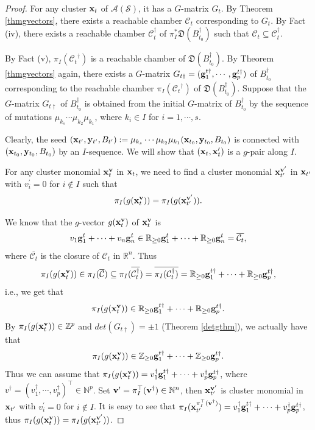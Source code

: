\documentclass[14pt]{amsart}
\begin{document}
\begin{proof}
For any cluster ${\bf x}_t$ of  $\mathcal A(\mathcal S)$, it has a $G$-matrix $G_t$. By Theorem \ref{thmgvectors}, there exists a reachable chamber $\mathcal C_t$ corresponding to $G_t$.
By Fact (iv), there exists a reachable chamber $\mathcal C_t^{\dag}$  of $\pi_I^{\ast}\mathfrak D(B_{t_0}^\dag)$
such that  $\mathcal C_t\subseteq \mathcal C_t^{\dag}$.

By Fact (v), $\pi_I({\mathcal C_t}^\dag)$ is a reachable chamber of $\mathfrak D(B_{t_0}^\dag)$. By Theorem \ref{thmgvectors} again, there exists a $G$-matrix $G_{t\dag}=({\bf g}_1^{t\dag},\cdots,{\bf g}_p^{t\dag})$ of $B_{t_0}^\dag$ corresponding to the reachable chamber $\pi_I({\mathcal C_t}^\dag)$ of  $\mathfrak D(B_{t_0}^\dag)$.
Suppose that the $G$-matrix $G_{t\dag}$ of $B_{t_0}^\dag$ is obtained from the initial $G$-matrix of  $B_{t_0}^\dag$
by the sequence of mutations $\mu_{k_s}\cdots\mu_{k_2}\mu_{k_1}$, where $k_i\in I$ for $i=1,\cdots,s$.


Clearly, the seed $({\bf x}_{t^{\prime}},{\bf y}_{t^{\prime}},B_{t^{\prime}}):=\mu_{k_s}\cdots\mu_{k_2}\mu_{k_1}({\bf x}_{t_0},{\bf y}_{t_0},B_{t_0})$ is connected with $({\bf x}_{t_0},{\bf y}_{t_0},B_{t_0})$ by an $I$-sequence. We will show that $({\bf x}_t,{\bf x}_t^\prime)$ is a $g$-pair along $I$.

For any cluster monomial ${\bf x}_t^{\bf v}$ in ${\bf x}_t$, we need to find a cluster monomial ${\bf x}_{t^{\prime}}^{{\bf v}^{\prime}}$ in ${\bf x}_{t^{\prime}}$ with $v_i^{\prime}=0$ for $i\notin I$
  such that
$$\pi_I(g({\bf x}_t^{\bf v}))=\pi_I(g({\bf x}_{t^{\prime}}^{{\bf v}^{\prime}})).$$


 We know that the $g$-vector $g({\bf x}_t^{\bf v})$ of ${\bf x}_t^{\bf v}$ is $$v_1{\bf g}_1^t+\cdots +v_n{\bf g}_n^t\in\mathbb R_{\geq0}{\bf g}_1^t+\cdots+\mathbb R_{\geq0}{\bf g}_n^t=\overline {\mathcal C_t},$$
where $\overline{\mathcal C_t}$ is the closure of $\mathcal C_t$ in $\mathbb R^n$.
Thus $$\pi_I(g({\bf x}_t^{\bf v}))\in\pi_I(\overline{\mathcal C})\subseteq\pi_I(\overline{\mathcal C_t^{\dag}})=\overline{\pi_I(\mathcal C_t^{\dag})}=\mathbb R_{\geq 0}{\bf g}_1^{t\dag}+\cdots+\mathbb R_{\geq 0}{\bf g}_p^{t\dag},$$
i.e., we get that
$$\pi_I(g({\bf x}_t^{\bf v}))\in\mathbb R_{\geq 0}{\bf g}_1^{t\dag}+\cdots+\mathbb R_{\geq 0}{\bf g}_p^{t\dag}.$$
By $\pi_I(g({\bf x}_t^{\bf v}))\in \mathbb Z^p$ and $det (G_{t\dag})=\pm 1$ (Theorem \ref{detgthm}), we actually have that
$$\pi_I(g({\bf x}_t^{\bf v}))\in \mathbb Z_{\geq 0}{\bf g}_1^{t\dag}+\cdots+\mathbb Z_{\geq 0}{\bf g}_p^{t\dag}.$$
Thus we can assume that $\pi_I(g({\bf x}_t^{\bf v}))=v_1^{\dag}{\bf g}_1^{t\dag}+\cdots+v_p^{\dag}{\bf g}_p^{t\dag}$, where $v^{\dag}=(v_1^{\dag},\cdots,v_p^{\dag})^{\top}\in\mathbb N^p$.
 Set ${\bf v}^\prime=\pi_I^{\top}({\bf v}^{\dag})\in\mathbb N^n$, then ${\bf x}_{t^{\prime}}^{{\bf v}^{\prime}}$ is cluster monomial in ${\bf x}_{t^{\prime}}$ with $v_i^{\prime}=0$ for $i\notin I$. It is easy to see that  $\pi_I({\bf x}_{t^{\prime}}^{\pi_I^{\top}({\bf v}^{\dag})})=v_1^{\dag}{\bf g}_1^{t\dag}+\cdots+v_p^{\dag}{\bf g}_p^{t\dag}$, thus $\pi_I(g({\bf x}_t^{\bf v}))=\pi_I(g({\bf x}_{t^{\prime}}^{{\bf v}^{\prime}}))$.



\end{proof}
\end{document}
